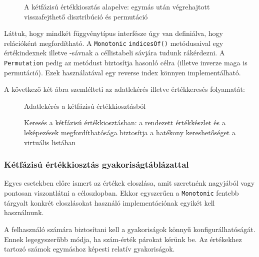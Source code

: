 \documentclass[
    parspace,
    noindent,
    nohyp,
]{elteiktdk}[2023/04/10]
\begin{document}
\begin{figure}[H]
\centering

\caption{A kétfázisú értékkiosztás alapelve: egymás után végrehajtott visszafejthető disztribúció és permutáció}
\end{figure}

Láttuk, hogy mindkét függvénytípus interfésze úgy van definiálva, hogy relációként megfordítható.
A \texttt{Monotonic} \texttt{indicesOf()} metódusaival egy értékindexnek illetve -sávnak
a céllistabeli sávjára tudunk rákérdezni.
A \texttt{Permutation} pedig az  metódust biztosítja hasonló célra
(illetve inverze maga is permutáció).
Ezek használatával egy reverse index könnyen implementálható.

A következő két ábra szemlélteti az adatlekérés illetve értékkeresés folyamatát:

\begin{figure}[H]
  \centering
  \hspace*{\fill}
  \begin{minipage}[t]{0.42\textwidth}
    
    \caption{Adatlekérés a kétfázisú értékkiosztásból}
  \end{minipage}
  \hspace*{\fill}
  \begin{minipage}[t]{0.42\textwidth}
    
    \caption{
      Keresés a kétfázisú értékkiosztásban:
      a rendezett értékkészlet és a leképezések megfordíthatósága
      biztosítja a hatékony kereshetőséget a virtuális listában
    }
  \end{minipage}
  \hspace*{\fill}
\end{figure}

\subsubsection{Kétfázisú értékkiosztás gyakoriságtáblázattal}

Egyes esetekben előre ismert az értékek eloszlása,
amit szeretnénk nagyjából vagy pontosan viszontlátni a céloszlopban.
Ekkor egyszerűen a \texttt{Monotonic} fentebb tárgyalt konkrét eloszlásokat használó
implementációnak egyikét kell használnunk.

A felhasználó számára biztosítani kell a gyakoriságok könnyű konfigurálhatóságát.
Ennek legegyszerűbb módja, ha szám-érték párokat kérünk be.
Az értékekhez tartozó számok egymáshoz képesti relatív gyakoriságok.
\end{document}

